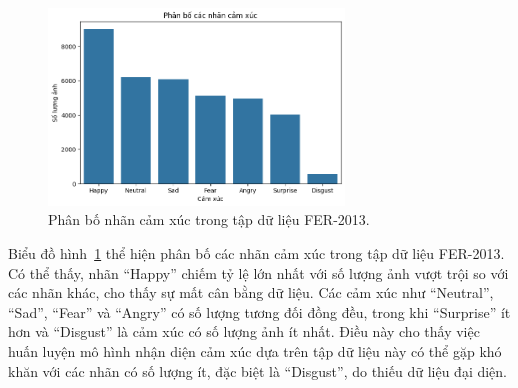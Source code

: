 \begin{figure}[H]
    \centering
    \includegraphics[width=0.7\textwidth]{img/phan_bo_nhan_cam_xuc.png} %
    \caption{Phân bố nhãn cảm xúc trong tập dữ liệu FER-2013.}
    \label{fig:emotion_distribution}
\end{figure}

Biểu đồ hình~\ref{fig:emotion_distribution} thể hiện phân bố các nhãn cảm xúc trong tập dữ liệu FER-2013. Có thể thấy, nhãn “Happy” chiếm tỷ lệ lớn nhất với số lượng ảnh vượt trội so với các nhãn khác, cho thấy sự mất cân bằng dữ liệu. Các cảm xúc như “Neutral”, “Sad”, “Fear” và “Angry” có số lượng tương đối đồng đều, trong khi “Surprise” ít hơn và “Disgust” là cảm xúc có số lượng ảnh ít nhất. Điều này cho thấy việc huấn luyện mô hình nhận diện cảm xúc dựa trên tập dữ liệu này có thể gặp khó khăn với các nhãn có số lượng ít, đặc biệt là “Disgust”, do thiếu dữ liệu đại diện.


